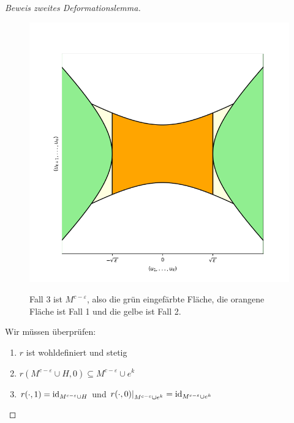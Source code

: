 \begin{proof}[Beweis zweites Deformationslemma]
    \begin{figure}[H]
        \centering
        \includegraphics[width=0.8\linewidth]{resources/Me-Diagram9-handle-cases.png}
        \label{me-diagram9}
        \caption{
            Fall 3 ist $M^{c - \varepsilon}$, also die grün eingefärbte Fläche, die
            orangene Fläche ist Fall 1 und die gelbe ist Fall 2.
        }
    \end{figure}

    Wir müssen überprüfen:
    \begin{enumerate}
        \item $r$ ist wohldefiniert und stetig
        \item $r(M^{c - \varepsilon} \cup H, 0) \subseteq M^{c - \varepsilon} \cup e^k$
        \item $r(\cdot, 1) = { \operatorname{id} }_{M^{c - \varepsilon} \cup H}$ und 
            $\left. r(\cdot , 0) \right\vert_{M^{c - \varepsilon} \cup e^k} 
            = { \operatorname{id} }_{M^{c - \varepsilon} \cup e^k}$
    \end{enumerate}


\end{proof}
